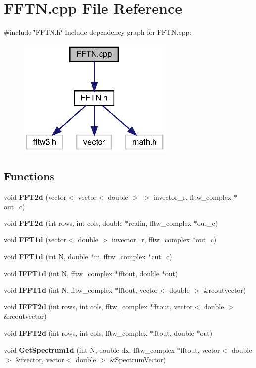 \section{F\+F\+T\+N.\+cpp File Reference}
\label{FFTN_8cpp}
{\ttfamily \#include \char`\"{}F\+F\+T\+N.\+h\char`\"{}}\newline
Include dependency graph for F\+F\+T\+N.\+cpp\+:\nopagebreak
\begin{figure}[H]
\begin{center}
\leavevmode
\includegraphics[width=215pt]{FFTN_8cpp__incl}
\end{center}
\end{figure}
\subsection*{Functions}
\begin{DoxyCompactItemize}
\item 
void \textbf{ F\+F\+T2d} (vector$<$ vector$<$ double $>$ $>$ invector\+\_\+r, fftw\+\_\+complex $\ast$out\+\_\+c)
\item 
void \textbf{ F\+F\+T2d} (int rows, int cols, double $\ast$realin, fftw\+\_\+complex $\ast$out\+\_\+c)
\item 
void \textbf{ F\+F\+T1d} (vector$<$ double $>$ invector\+\_\+r, fftw\+\_\+complex $\ast$out\+\_\+c)
\item 
void \textbf{ F\+F\+T1d} (int N, double $\ast$in, fftw\+\_\+complex $\ast$out\+\_\+c)
\item 
void \textbf{ I\+F\+F\+T1d} (int N, fftw\+\_\+complex $\ast$fftout, double $\ast$out)
\item 
void \textbf{ I\+F\+F\+T1d} (int N, fftw\+\_\+complex $\ast$fftout, vector$<$ double $>$ \&reoutvector)
\item 
void \textbf{ I\+F\+F\+T2d} (int rows, int cols, fftw\+\_\+complex $\ast$fftout, vector$<$ double $>$ \&reoutvector)
\item 
void \textbf{ I\+F\+F\+T2d} (int rows, int cols, fftw\+\_\+complex $\ast$fftout, double $\ast$out)
\item 
void \textbf{ Get\+Spectrum1d} (int N, double dx, fftw\+\_\+complex $\ast$fftout, vector$<$ double $>$ \&fvector, vector$<$ double $>$ \&Spectrum\+Vector)
\end{DoxyCompactItemize}


